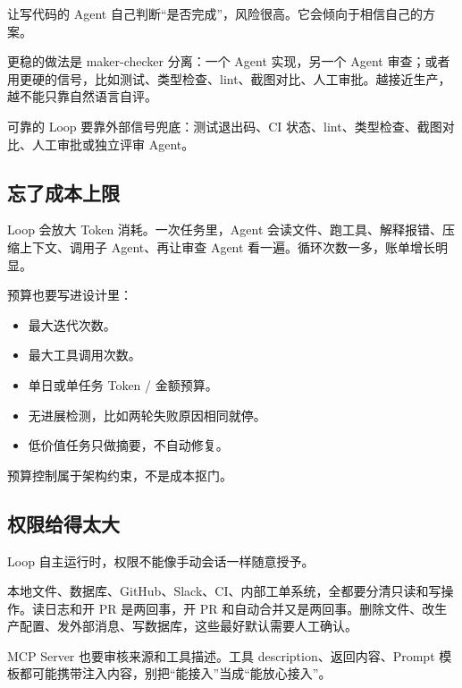 \documentclass[9pt,a4paper,twocolumn]{ctexart}
\begin{document}
让写代码的 Agent 自己判断“是否完成”，风险很高。它会倾向于相信自己的方案。



更稳的做法是 maker-checker 分离：一个 Agent 实现，另一个 Agent 审查；或者用更硬的信号，比如测试、类型检查、lint、截图对比、人工审批。越接近生产，越不能只靠自然语言自评。



可靠的 Loop 要靠外部信号兜底：测试退出码、CI 状态、lint、类型检查、截图对比、人工审批或独立评审 Agent。



\subsection*{忘了成本上限}


Loop 会放大 Token 消耗。一次任务里，Agent 会读文件、跑工具、解释报错、压缩上下文、调用子 Agent、再让审查 Agent 看一遍。循环次数一多，账单增长明显。



预算也要写进设计里：


\begin{itemize}[itemsep=1pt, topsep=2pt]
  \item 最大迭代次数。
  \item 最大工具调用次数。
  \item 单日或单任务 Token / 金额预算。
  \item 无进展检测，比如两轮失败原因相同就停。
  \item 低价值任务只做摘要，不自动修复。
\end{itemize}


预算控制属于架构约束，不是成本抠门。



\subsection*{权限给得太大}


Loop 自主运行时，权限不能像手动会话一样随意授予。



本地文件、数据库、GitHub、Slack、CI、内部工单系统，全都要分清只读和写操作。读日志和开 PR 是两回事，开 PR 和自动合并又是两回事。删除文件、改生产配置、发外部消息、写数据库，这些最好默认需要人工确认。



MCP Server 也要审核来源和工具描述。工具 description、返回内容、Prompt 模板都可能携带注入内容，别把“能接入”当成“能放心接入”。
\end{document}
